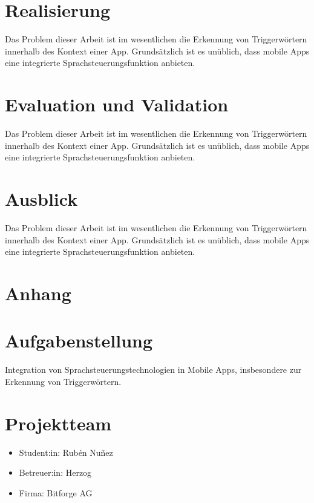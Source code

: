\documentclass[11pt,a4paper]{article}
\newcommand\blankpage{%
    \null
    \thispagestyle{empty}%
    \addtocounter{page}{-1}%
    \newpage}
\begin{document}
\newpage
\section{Realisierung}
Das Problem dieser Arbeit ist im wesentlichen die Erkennung von Triggerwörtern innerhalb
des Kontext einer App. Grundsätzlich ist es unüblich, dass mobile Apps eine
integrierte Sprachsteuerungsfunktion anbieten.


\newpage
\section{Evaluation und Validation}
Das Problem dieser Arbeit ist im wesentlichen die Erkennung von Triggerwörtern innerhalb
des Kontext einer App. Grundsätzlich ist es unüblich, dass mobile Apps eine
integrierte Sprachsteuerungsfunktion anbieten.

\newpage
\section{Ausblick}
Das Problem dieser Arbeit ist im wesentlichen die Erkennung von Triggerwörtern innerhalb
des Kontext einer App. Grundsätzlich ist es unüblich, dass mobile Apps eine
integrierte Sprachsteuerungsfunktion anbieten.


\newpage
\section{Anhang}

\newpage

\listoffigures
{}
\listoftables
\printbibliography[title=Literaturverzeichnis, heading=bibintoc]





\newpage
\pagecolor{ba-gray}
\afterpage{\nopagecolor}
\blankpage

\newpage
\section*{Aufgabenstellung}
Integration von Sprachsteuerungstechnologien in Mobile Apps, insbesondere zur Erkennung
von Triggerwörtern.

\section*{Projektteam}
\begin{itemize}
    \item Student:in: Rubén Nuñez
    \item Betreuer:in: Herzog
    \item Firma: Bitforge AG
\end{itemize}
\end{document}
